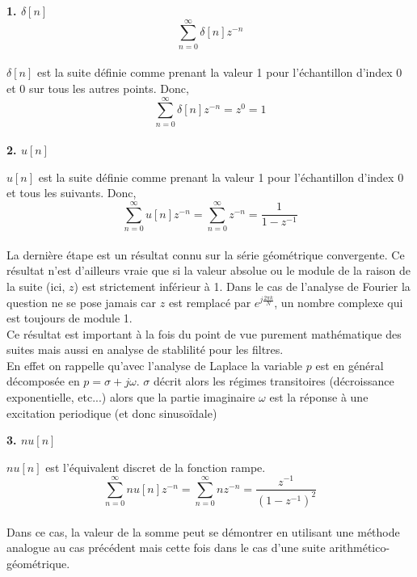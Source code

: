 \documentclass[11pt,a4paper]{article}
\begin{document}
\textbf{1. $\delta[n]$}
\[\sum_{n = 0}^{\infty} \delta[n] z^{-n}\] \\

$\delta[n]$ est la suite définie comme prenant la valeur 1 pour l'échantillon d'index 0 et 0 sur tous les autres points. Donc,\\

\[\sum_{n = 0}^{\infty} \delta[n] z^{-n} = z^0 = 1 \]\\

\textbf{2. $u[n]$}

$u[n]$ est la suite définie comme prenant la valeur 1 pour l'échantillon d'index 0 et tous les suivants. Donc,\\

\[\sum_{n = 0}^{\infty} u[n] z^{-n} = \sum_{n = 0}^{\infty} z^{-n}  = \frac{1}{1-z^{-1}} \]\\

La dernière étape est un résultat connu sur la série géométrique convergente. Ce résultat n'est d'ailleurs vraie que si la valeur absolue ou le module de la raison de la suite (ici, $z$) est strictement inférieur à 1.  Dans le cas de l'analyse de Fourier la question ne se pose jamais car $z$ est remplacé par $e^{j\frac{2 \pi k }{N}}$, un nombre complexe qui est toujours de  module 1.\\

Ce résultat est important à la fois du point de vue purement mathématique des suites mais aussi en analyse de stablilité pour les filtres.\\

En effet on rappelle qu'avec l'analyse de  Laplace la variable $p$ est en général décomposée en $p = \sigma + j \omega$.  $\sigma$ décrit alors les régimes transitoires (décroissance exponentielle, etc...) alors que la partie imaginaire $\omega$ est la réponse à une excitation periodique (et donc sinusoïdale)

\textbf{3. $nu[n]$}

 $nu[n]$ est l'équivalent discret de la fonction rampe.\\
 

\[\sum_{n = 0}^{\infty} n u[n] z^{-n} = \sum_{n = 0}^{\infty} n z^{-n}  = \frac{z^{-1}}{(1-z^{-1})^2} \]\\ 

Dans ce cas, la valeur de la somme peut se démontrer en utilisant une méthode analogue au cas précédent mais cette fois dans le cas d'une suite arithmético-géométrique.

\end{document}
